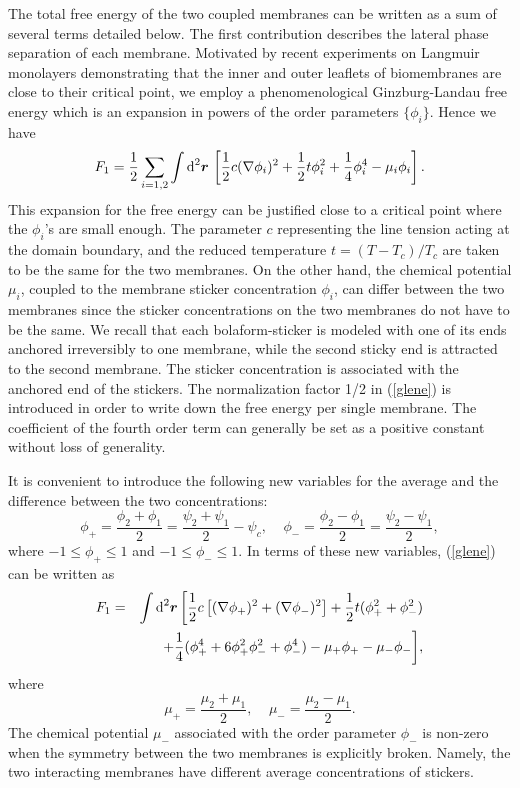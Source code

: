 The total free energy of the two coupled membranes can be written as
a sum of several terms detailed below.
The first contribution describes the lateral phase separation
of each membrane.
Motivated by recent experiments on Langmuir monolayers
\cite{KPHM,KM} demonstrating that the inner and outer leaflets
of biomembranes are close to their critical point, we employ a
phenomenological Ginzburg-Landau free energy which is an expansion in
powers of the order parameters $\{\phi_i\}$.
Hence we have
\begin{equation}
F_1= \frac{1}{2} \sum_{i=1,2} \int \mbox{d}^2 \mbox{\boldmath
$r$} \, \left[ \frac{1}{2} c (\nabla \phi_i)^2 + \frac{1}{2}t
\phi_i^2 + \frac{1}{4} \phi_i^4 -\mu_i \phi_i \right].
\label{glene}
\end{equation}
This expansion for the free energy can be justified close to a
critical point where the $\phi_i$'s are small enough. The
parameter $c$ representing the line tension acting at the domain
boundary, and the reduced temperature $t = (T-T_c)/T_c$ are taken
to be the same for the two membranes. On the other hand, the
chemical potential $\mu_i$, coupled to the membrane sticker
concentration $\phi_i$, can differ between the two membranes since
the sticker concentrations on the two membranes do not have to be
the same. We recall that each bolaform-sticker is modeled with one
of its ends anchored irreversibly to one membrane, while the
second sticky end is attracted to the second membrane. The sticker
concentration is associated with the anchored end of the stickers.
The normalization factor 1/2 in (\ref{glene})
is introduced in order to write down the
free energy per single membrane.
The coefficient of the fourth order term can generally be
set as a positive constant without loss of generality.


It is convenient to introduce the following new variables
for the average and the difference between the two concentrations:
%
\begin{equation}
\phi_+ = \frac{\phi_2+\phi_1}{2}=\frac{\psi_2+\psi_1}{2}-\psi_c,~~~~~
\phi_- = \frac{\phi_2-\phi_1}{2}=\frac{\psi_2-\psi_1}{2},
\end{equation}
%
where $-1 \le \phi_+ \le 1$ and $-1 \le \phi_- \le 1$.
In terms of these new variables, (\ref{glene}) can be written as
\begin{eqnarray}
F_1 = & & \int \mbox{d}^2 \mbox{\boldmath $r$} \, \biggl[
\frac{1}{2} c \left[ (\nabla \phi_+)^2 + (\nabla \phi_-)^2 \right]
+\frac{1}{2} t (\phi_+^2 + \phi_-^2) \nonumber  \\ & & +
\frac{1}{4} (\phi_+^4 + 6 \phi_+^2 \phi_-^2 + \phi_-^4) -\mu_+
\phi_+ - \mu_- \phi_- \biggr], \label{glene2}
\end{eqnarray}
where
\begin{equation}
\mu_+ = \frac{\mu_2+\mu_1}{2},~~~~~
\mu_- = \frac{\mu_2-\mu_1}{2}.
\end{equation}
The chemical potential $\mu_-$ associated with the order parameter
$\phi_-$ is non-zero when the symmetry between the two membranes is
explicitly broken.
Namely, the two interacting membranes have different average
concentrations of stickers.


